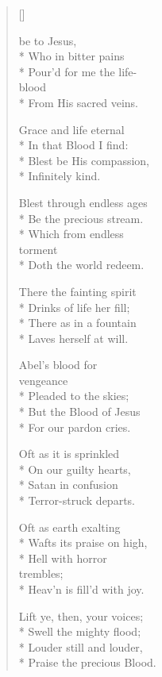 \newHymn
{}

\begin{multicols}{2}
\begin{verse}[\versewidth]

 be to Jesus,\\*
Who in bitter pains\\*
Pour'd for me the life-\\
\qquad blood\\*
From His sacred veins.

 Grace and life eternal\\*
In that Blood I find:\\*
Blest be His compassion,\\*
Infinitely kind.

 Blest through endless ages\\*
Be the precious stream.\\*
Which from endless\\
\qquad torment\\*
Doth the world redeem. 

 There the fainting spirit\\*
Drinks of life her fill;\\*
There as in a fountain\\*
Laves herself at will. 

 Abel's blood for\\
\qquad vengeance\\*
Pleaded to the skies;\\*
But the Blood of Jesus\\*
For our pardon cries. 

 Oft as it is sprinkled\\*
On our guilty hearts,\\* 
Satan in confusion\\*
Terror-struck departs. 

 Oft as earth exalting\\*
Wafts its praise on high,\\*
Hell with horror\\
\qquad trembles;\\*
Heav'n is fill'd with joy. 

 Lift ye, then, your voices;\\*
Swell the mighty flood;\\*
Louder still and louder,\\*
Praise the precious Blood.

\end{verse}
\end{multicols}


